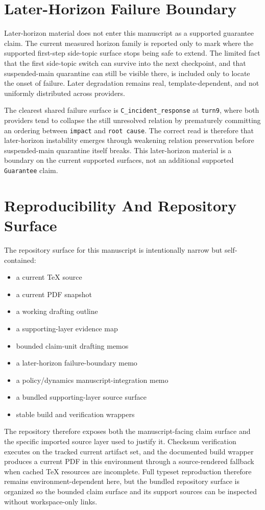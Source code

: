 \documentclass[11pt]{article}
\begin{document}
\section{Later-Horizon Failure Boundary}

Later-horizon material does not enter this manuscript as a supported guarantee
claim. The current measured horizon family is reported only to mark where the
supported first-step side-topic surface stops being safe to extend. The limited
fact that the first side-topic switch can survive into the next checkpoint, and
that suspended-main quarantine can still be visible there, is included only to
locate the onset of failure. Later degradation remains real, template-dependent,
and not uniformly distributed across providers.

The clearest shared failure surface is \texttt{C\_incident\_response} at
\texttt{turn9}, where both providers tend to collapse the still unresolved
relation by prematurely committing an ordering between \texttt{impact} and
\texttt{root cause}. The correct read is therefore that later-horizon
instability emerges through weakening relation preservation before
suspended-main quarantine itself breaks. This later-horizon material is a
boundary on the current supported surfaces, not an additional supported
\texttt{Guarantee} claim.

\section{Reproducibility And Repository Surface}

The repository surface for this manuscript is intentionally narrow but
self-contained:
\begin{itemize}
\item a current TeX source
\item a current PDF snapshot
\item a working drafting outline
\item a supporting-layer evidence map
\item bounded claim-unit drafting memos
\item a later-horizon failure-boundary memo
\item a policy/dynamics manuscript-integration memo
\item a bundled supporting-layer source surface
\item stable build and verification wrappers
\end{itemize}

The repository therefore exposes both the manuscript-facing claim surface and
the specific imported source layer used to justify it. Checksum verification
executes on the tracked current artifact set, and the documented build wrapper
produces a current PDF in this environment through a source-rendered fallback
when cached TeX resources are incomplete. Full typeset reproduction therefore
remains environment-dependent here, but the bundled repository surface is
organized so the bounded claim surface and its support sources can be inspected
without workspace-only links.
\end{document}
